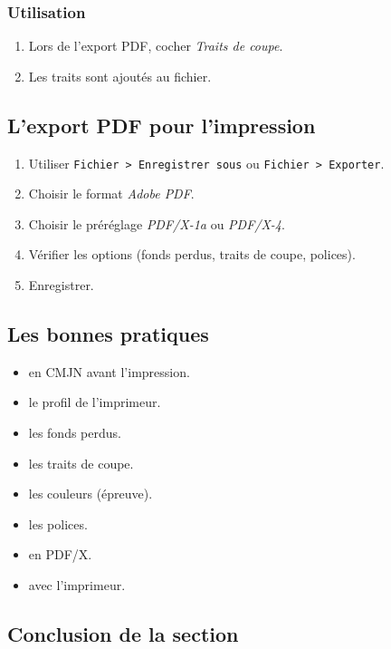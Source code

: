 \subsubsection{Utilisation}

\begin{enumerate}
    \item Lors de l'export PDF, cocher \emph{Traits de coupe}.
    \item Les traits sont ajoutés au fichier.
\end{enumerate}

\subsection{L'export PDF pour l'impression}

\begin{enumerate}
    \item Utiliser \texttt{Fichier > Enregistrer sous} ou \texttt{Fichier > Exporter}.
    \item Choisir le format \emph{Adobe PDF}.
    \item Choisir le préréglage \emph{PDF/X-1a} ou \emph{PDF/X-4}.
    \item Vérifier les options (fonds perdus, traits de coupe, polices).
    \item Enregistrer.
\end{enumerate}

\subsection{Les bonnes pratiques}

\begin{itemize}
    \item {} en CMJN avant l'impression.
    \item {} le profil de l'imprimeur.
    \item {} les fonds perdus.
    \item {} les traits de coupe.
    \item {} les couleurs (épreuve).
    \item {} les polices.
    \item {} en PDF/X.
    \item {} avec l'imprimeur.
\end{itemize}

\subsection*{Conclusion de la section}

